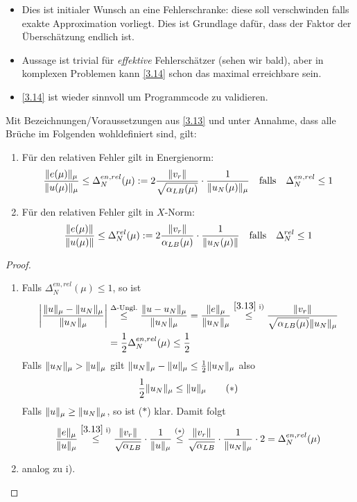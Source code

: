 \begin{bem} \beginwithlistbem
	\begin{itemize}
		\item Dies ist initialer Wunsch an eine Fehlerschranke: diese soll verschwinden falls exakte Approximation vorliegt.
			Dies ist Grundlage dafür, dass der Faktor der Überschätzung endlich ist.
		\item Aussage ist trivial für \emph{effektive} Fehlerschätzer (sehen wir bald), aber in komplexen Problemen kann \ref{3.14} schon das maximal erreichbare sein.
		\item \ref{3.14} ist wieder sinnvoll um Programmcode zu validieren.
	\end{itemize}
\end{bem}

\begin{satz} \label{3.15}
	Mit Bezeichnungen/Voraussetzungen aus \ref{3.13} und unter Annahme, dass alle Brüche im Folgenden wohldefiniert sind, gilt:
	\begin{enumerate}
		\item Für den relativen Fehler gilt in Energienorm:
			\[
				\frac{\|e(\mu)\|_\mu}{\|u(\mu)\|_\mu} \leq \Delta_N^{en,rel}(\mu) := 2 \frac{\|v_r\|}{\sqrt{\alpha_{LB}(\mu)}} \cdot \frac{1}{\|u_N(\mu)\|_\mu} \quad \text{falls} \quad \Delta_N^{en,rel} \leq 1
			\]
		\item Für den relativen Fehler gilt in $X$-Norm:
			\[
				\frac{\|e(\mu)\|}{\|u(\mu)\|} \leq \Delta_N^{rel}(\mu) := 2 \frac{\|v_r\|}{\alpha_{LB}(\mu)} \cdot \frac{1}{\|u_N(\mu)\|} \quad \text{falls} \quad \Delta_N^{rel} \leq 1
			\]
	\end{enumerate}

	\begin{proof} \beginwithlistbew
		\begin{enumerate}
			\item Falls $\Delta_N^{en,rel}(\mu) \leq 1$, so ist
				\begin{align*}
					\left| \frac{\|u\|_\mu-\|u_N\|_\mu}{\|u_N\|_\mu} \right| &\stackrel{\Delta \text{-Ungl.}}{\leq} \frac{\|u-u_N\|_\mu}{\|u_N\|_\mu} = \frac{\|e\|_\mu}{\|u_N\|_\mu} \stackrel{\ref{3.13} \text{ i)}}{\leq} \frac{\|v_r\|}{\sqrt{\alpha_{LB}(\mu)} \|u_N\|_\mu}\\
					&= \frac 1 2 \Delta_N^{en,rel}(\mu) \leq \frac 1 2
				\end{align*}
				Falls $\|u_N\|_\mu > \|u\|_\mu$ gilt $\|u_N\|_\mu-\|u\|_\mu \leq \frac 1 2 \|u_N\|_\mu$ also
				\[
					\frac 1 2 \|u_N\|_\mu \leq \|u\|_\mu \tag{$*$}
				\]
				Falls $\|u\|_\mu \geq \|u_N\|_\mu$, so ist ($*$) klar.
				Damit folgt
				\[
					\frac{\|e\|_\mu}{\|u\|_\mu} \stackrel{\ref{3.13} \text{ i)}}{\leq} \frac{\|v_r\|}{\sqrt{\alpha_{LB}}} \cdot \frac{1}{\|u\|_\mu} \stackrel{(*)}{\leq} \frac{\|v_r\|}{\sqrt{\alpha_{LB}}} \cdot \frac{1}{\|u_N\|_\mu} \cdot 2 = \Delta_N^{en,rel}(\mu)
				\]
			\item analog zu i).
		\end{enumerate}
	\end{proof}
\end{satz}

